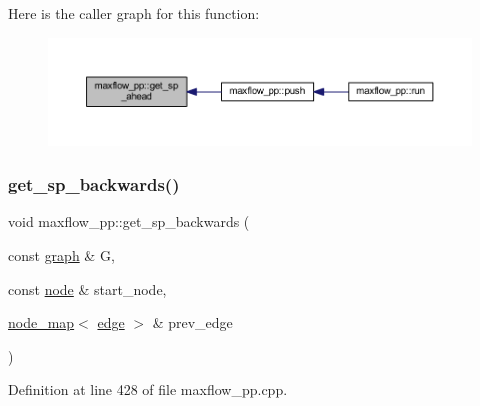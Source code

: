 Here is the caller graph for this function\+:\nopagebreak
\begin{figure}[H]
\begin{center}
\leavevmode
\includegraphics[width=350pt]{classmaxflow__pp_a340e4b9909a44ed7003760017c761e3b_icgraph}
\end{center}
\end{figure}
\mbox{\label{classmaxflow__pp_a58b7af1b215766e99adcca0994ecfb7a}} 
\subsubsection{\texorpdfstring{get\+\_\+sp\+\_\+backwards()}{get\_sp\_backwards()}}
{\footnotesize\ttfamily void maxflow\+\_\+pp\+::get\+\_\+sp\+\_\+backwards (\begin{DoxyParamCaption}\item[{const \mbox{\hyperlink{classgraph}{graph}} \&}]{G,  }\item[{const \mbox{\hyperlink{classnode}{node}} \&}]{start\+\_\+node,  }\item[{\mbox{\hyperlink{classnode__map}{node\+\_\+map}}$<$ \mbox{\hyperlink{classedge}{edge}} $>$ \&}]{prev\+\_\+edge }\end{DoxyParamCaption})\hspace{0.3cm}{\ttfamily [protected]}}



Definition at line 428 of file maxflow\+\_\+pp.\+cpp.


